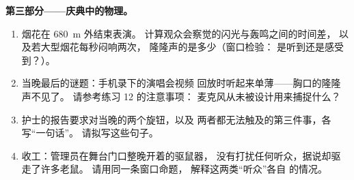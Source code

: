 \begin{problem}
\medskip\noindent\textbf{第三部分——庆典中的物理。}
\begin{enumerate}[resume]
  \item 烟花在 \qty{680}{m} 外结束表演。
        计算观众会察觉的闪光与轰鸣之间的时间差，
        以及若大型烟花每秒闷响两次，
        隆隆声的是多少（窗口检验：
        是听到还是感受到？）。
  \item 当晚最后的谜题：手机录下的演唱会视频
        回放时听起来单薄——胸口的隆隆声不见了。
        请参考练习 12 的注意事项：
        麦克风从未被设计用来捕捉什么？
  \item 护士的报告要求对当晚的两个旋钮，以及
        两者都无法触及的第三件事，各写“一句话”。
        请拟写这些句子。
  \item 收工：管理员在舞台门口整晚开着的驱鼠器，
        没有打扰任何听众，据说却驱走了许多老鼠。
        请用同一条窗口命题，
        解释这两类“听众”各自
        的情况。
\end{enumerate}
\end{problem}
